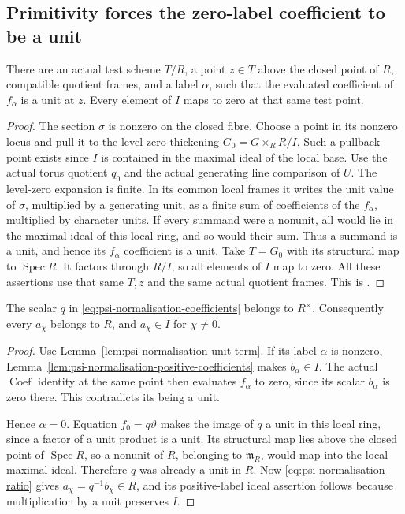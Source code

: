 \subsection{Primitivity forces the zero-label coefficient to be a unit}
\begin{srlemma}
\label{lem:psi-normalisation-unit-term}
There are an actual test scheme \(T/R\), a point \(z\in T\)
above the closed point of \(R\), compatible quotient frames,
and a label \(\alpha\), such that the evaluated coefficient
of \(f_\alpha\) is a unit at \(z\).
Every element of \(I\) maps to zero at that same test point.
\end{srlemma}
\begin{proof}
The section \(\sigma\) is nonzero on the closed fibre.
Choose a point in its nonzero locus and pull it to the
level-zero thickening \(G_0=G\times_R R/I\).
Such a pullback point exists since \(I\) is contained in
the maximal ideal of the local base.
Use the actual torus quotient \(q_0\) and the actual
generating line comparison of \(U\).
The level-zero expansion is finite. In its common local
frames it writes the unit value of \(\sigma\), multiplied
by a generating unit, as a finite sum of coefficients of
the \(f_\alpha\), multiplied by character units.
If every summand were a nonunit, all would lie in the
maximal ideal of this local ring, and so would their sum.
Thus a summand is a unit, and hence its \(f_\alpha\)
coefficient is a unit.
Take \(T=G_0\) with its structural map to \(\operatorname{Spec}R\).
It factors through \(R/I\), so all elements of \(I\) map
to zero.  All these assertions use that same \(T,z\) and
the same actual quotient frames.
This is .
\end{proof}

\begin{srproposition}
\label{prop:psi-normalisation-q-unit}
The scalar \(q\) in \eqref{eq:psi-normalisation-coefficients}
belongs to \(R^\times\). Consequently every \(a_\chi\)
belongs to \(R\), and \(a_\chi\in I\) for \(\chi\ne0\).
\end{srproposition}
\begin{proof}
Use Lemma~\ref{lem:psi-normalisation-unit-term}.
If its label \(\alpha\) is nonzero,
Lemma~\ref{lem:psi-normalisation-positive-coefficients}
makes \(b_\alpha\in I\).
The actual \(\operatorname{Coef}\) identity at the same point
then evaluates \(f_\alpha\) to zero, since its scalar
\(b_\alpha\) is zero there. This contradicts its being a unit.

Hence \(\alpha=0\). Equation \(f_0=q\vartheta\) makes the image
of \(q\) a unit in this local ring, since a factor of a
unit product is a unit.
Its structural map lies above the closed point of
\(\operatorname{Spec}R\), so a nonunit of \(R\), belonging
to \(\mathfrak m_R\), would map into the local maximal
ideal.  Therefore \(q\) was already a unit in \(R\).
Now \eqref{eq:psi-normalisation-ratio} gives
\(a_\chi=q^{-1}b_\chi\in R\), and its positive-label
ideal assertion follows because multiplication by a unit
preserves \(I\).
\end{proof}

